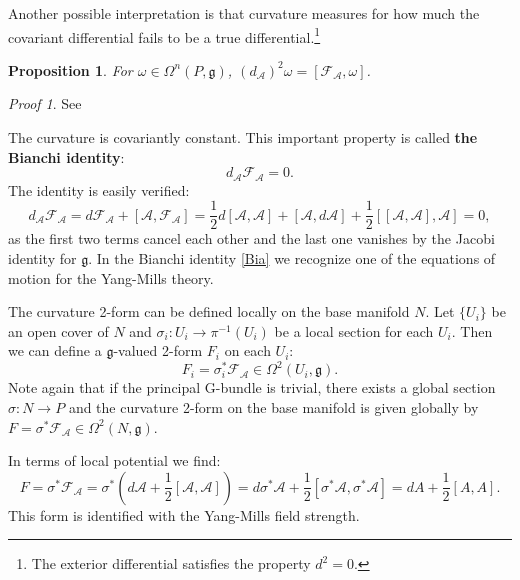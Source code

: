 \documentclass[11pt]{report}
\theoremstyle{plain}
\newtheorem{prop}[thm]{Proposition}
\theoremstyle{definition}
\theoremstyle{remark}
\theoremstyle{remark}
\newtheorem*{pr}{Proof}
\numberwithin{equation}{section}
\begin{document}
Another possible interpretation is that curvature measures for how much the covariant differential fails to be a true differential.\footnote{The exterior differential satisfies the property $d^2 = 0$.}
\begin{prop}
For $\omega \in \Omega^n(P,\mathfrak{g})$, $(d_\mathcal{A})^2\omega = [\mathcal{F}_{\mathcal{A}}, \omega]$.
\end{prop}

\begin{pr}
See \cite{Meinrenken} 
\end{pr}

The curvature is covariantly constant. This important property is called \textbf{the Bianchi identity}:
\begin{equation}\label{Bia}
d_\mathcal{A} \mathcal{F}_{\mathcal{A}} = 0.
\end{equation}
The identity is easily verified:
$$ d_\mathcal{A} \mathcal{F}_{\mathcal{A}} =d \mathcal{F}_{\mathcal{A}} +[\mathcal{A}, \mathcal{F}_{\mathcal{A}}] = \frac{1}{2}d[\mathcal{A},\mathcal{A}] + [\mathcal{A},d\mathcal{A}] + \frac{1}{2}[[\mathcal{A},\mathcal{A}], \mathcal{A}] = 0,$$
as the first two terms cancel each other and the last one vanishes by the Jacobi identity for $\mathfrak{g}$. 
In the Bianchi identity \eqref{Bia} we recognize one of the equations of motion for the Yang-Mills theory. 

The curvature 2-form can be defined locally on the base manifold $N$. Let $\{U_i\}$ be an open cover of $N$ and $\sigma_i: U_i \to \pi^{-1}(U_i)$ be a local section for each $U_i$. Then we can define a $\mathfrak{g}$-valued 2-form $F_i$ on each $U_i$:
\begin{equation}\label{local F}
F_i = \sigma_i^*\mathcal{F}_\mathcal{A} \in \Omega^2(U_i, \mathfrak{g}).
\end{equation}
Note again that if the principal G-bundle is trivial, there exists a global section $\sigma: N \to P$ and the curvature 2-form on the base manifold is given globally by $F = \sigma^*\mathcal{F}_\mathcal{A} \in \Omega^2(N, \mathfrak{g})$.

In terms of local potential we find:
$$ 
F = \sigma^*\mathcal{F}_\mathcal{A} = \sigma^*(d\mathcal{A} +\frac{1}{2}[\mathcal{A}, \mathcal{A}]) = d\sigma^*\mathcal{A} +\frac{1}{2}[\sigma^*\mathcal{A}, \sigma^*\mathcal{A}] = dA + \frac{1}{2}[A, A].$$
This form is identified with the Yang-Mills field strength.
\end{document}
